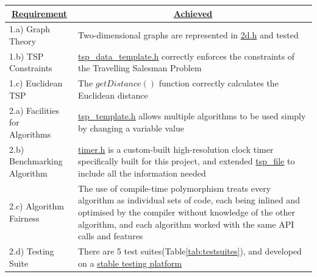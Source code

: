 \begin{table}[H]
    \centering
    \renewcommand{\arraystretch}{1.2} %
    \begin{tabularx}{\textwidth}{|p{4cm}|X|}
\hline
\multicolumn{1}{|c|}{{\ul \textbf{Requirement}}} & \multicolumn{1}{c|}{{\ul \textbf{Achieved}}} \\ \hline
1.a) Graph Theory                              &  Two-dimensional graphs are represented in \href{https://github.com/AndrewF001/Dissertation/blob/main/TSP_Solution/TSP_Library/tsp_data/types/2d.h}{2d.h} and tested     \\ \hline
1.b) TSP Constraints                           &  \href{https://github.com/AndrewF001/Dissertation/blob/main/TSP_Solution/TSP_Library/tsp_data/tsp_data_template.h}{tsp\_data\_template.h} correctly enforces the constraints of the Travelling Salesman Problem     \\ \hline
1.c) Euclidean TSP                             &  The $getDistance()$ function correctly calculates the Euclidean distance  \\ \hline
 \makecell[l]{2.a) Facilities for \\ Algorithms}                  &  \href{https://github.com/AndrewF001/Dissertation/blob/main/TSP_Solution/TSP_Library/tsp_template.h}{tsp\_template.h} allows multiple algorithms to be used simply by changing a variable value   \\ \hline
 \makecell[l]{2.b) Benchmarking \\ Algorithm}                     &   \href{https://github.com/AndrewF001/Dissertation/blob/main/TSP_Solution/Utilities/timer.h}{timer.h} is a custom-built high-resolution clock timer specifically built for this project, and extended \href{https://github.com/AndrewF001/Dissertation/blob/main/TSP_Solution/TSP_Library/file_handling/tsp_structs.h}{tsp\_file} to include all the information needed\\ \hline
2.c) Algorithm Fairness                        &   The use of compile-time polymorphism treats every algorithm as individual sets of code, each being inlined and optimised by the compiler without knowledge of the other algorithm, and each algorithm worked with the same API calls and features\\ \hline
2.d) Testing Suite                             &  There are 5 test suites(Table\ref{tab:testsuites}), and developed on a \href{https://github.com/AndrewF001/Dissertation/blob/main/TSP_Solution/Empirical_Testing/Tests/test_class.h}{stable testing platform}                                          \\ \hline

\end{tabularx}
\end{table}
